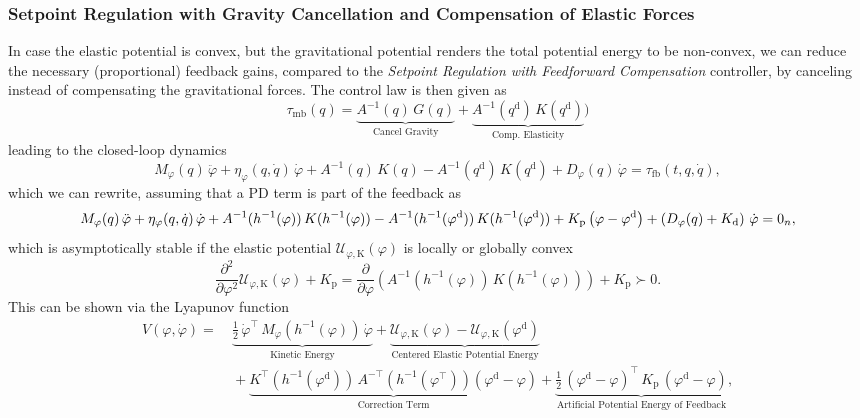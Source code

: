 \subsubsection{Setpoint Regulation with Gravity Cancellation and Compensation of Elastic Forces}
In case the elastic potential is convex, but the gravitational potential renders the total potential energy to be non-convex, we can reduce the necessary (proportional) feedback gains, compared to the \emph{Setpoint Regulation with Feedforward Compensation} controller, by canceling instead of compensating the gravitational forces. The control law is then given as~\citep{della2020model}
\begin{equation}
    \tau_\mathrm{mb}(q) =  \underbrace{A^{-1}(q) \, G(q)}_\text{Cancel Gravity} + \underbrace{A^{-1}(q^\mathrm{d}) \, K(q^\mathrm{d})}_\text{Comp. Elasticity} \big )
\end{equation}
leading to the closed-loop dynamics
\begin{equation}
    M_\varphi(q) \, \ddot{\varphi} + \eta_\varphi(q,\dot{q}) \, \dot{\varphi} + A^{-1}(q) \,  K(q) - A^{-1}(q^\mathrm{d}) \, K(q^\mathrm{d}) + D_\varphi(q) \, \dot{\varphi} = \tau_\mathrm{fb}(t, q, \dot{q}),
\end{equation}
which we can rewrite, assuming that a PD term is part of the feedback as
\begin{equation}\footnotesize
    M_\varphi(q) \, \ddot{\varphi} + \eta_\varphi(q,\dot{q}) \, \dot{\varphi} + A^{-1}(h^{-1}(\varphi)) \,  K(h^{-1}(\varphi)) - A^{-1}(h^{-1}(\varphi^\mathrm{d})) \, K(h^{-1}(\varphi^\mathrm{d})) + K_\mathrm{p} \left ( \varphi-\varphi^\mathrm{d} \right ) + \left ( D_\varphi(q) + K_\mathrm{d} \right ) \, \dot{\varphi} = 0_n,
\end{equation}
which is asymptotically stable if the elastic potential $\mathcal{U}_{\varphi,\mathrm{K}}(\varphi)$ is locally or globally convex
\begin{equation}\label{eq:background:model_based_control:fully_actuated:regulation_gravity_cancellation:closed_loop_potential_convexity}
    \frac{\partial^2}{\partial \varphi^2} \mathcal{U}_{\varphi,\mathrm{K}}(\varphi) + K_\mathrm{p} = \frac{\partial}{\partial \varphi} \left (  A^{-1}(h^{-1}(\varphi)) \,  K(h^{-1}(\varphi)) \right ) + K_\mathrm{p} \succ 0.
\end{equation}
This can be shown via the Lyapunov function~\citep{khalil2002nonlinear, della2020model, della2023model}
\begin{equation}
\begin{split}
    V(\varphi, \dot{\varphi}) =& \: \underbrace{\frac{1}{2} \, \dot{\varphi}^\top \, M_\varphi(h^{-1}(\varphi)) \, \dot{\varphi}}_\text{Kinetic Energy} + \underbrace{\mathcal{U}_{\varphi,\mathrm{K}}(\varphi) - \mathcal{U}_{\varphi,\mathrm{K}}(\varphi^\mathrm{d})}_\text{Centered Elastic Potential Energy}\\
    & \: + \underbrace{K^\top(h^{-1}(\varphi^\mathrm{d})) \, A^{-\top}(h^{-1}(\varphi^\top)) \left ( \varphi^\mathrm{d} - \varphi \right )}_\text{Correction Term} + \underbrace{\frac{1}{2} \, (\varphi^\mathrm{d} - \varphi)^\top \, K_\mathrm{p} \, (\varphi^\mathrm{d} - \varphi)}_\text{Artificial Potential Energy of Feedback},
\end{split}
\end{equation}
